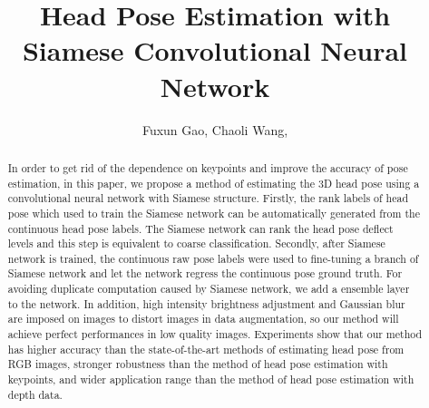 \documentclass[english]{DDCLSconf}
\begin{document}
\title{Head Pose Estimation with Siamese Convolutional Neural Network}

\author{Fuxun Gao,
        Chaoli Wang,
}




\maketitle

\begin{abstract}
	In order to get rid of the dependence on keypoints and improve the accuracy of pose estimation, in this paper, we propose a method of estimating the 3D head pose using a convolutional neural network with Siamese structure. Firstly, the rank labels of head pose which used to train the Siamese network can be automatically generated from the continuous head pose labels. The Siamese network can rank the head pose deflect levels and this step is equivalent to coarse classification. Secondly, after Siamese network is trained, the continuous raw pose labels were used to fine-tuning a branch of Siamese network and let the network regress the continuous pose ground truth. For avoiding duplicate computation caused by Siamese network, we add a ensemble layer to the network. In addition, high intensity brightness adjustment and Gaussian blur are imposed on images to distort images in data augmentation, so our method will achieve perfect performances in low quality images. Experiments show that our method has higher accuracy than the state-of-the-art methods of estimating head pose from RGB images, stronger robustness than the method of head pose estimation with keypoints, and wider application range than the method of head pose estimation with depth data.
\end{abstract}
\end{document}

